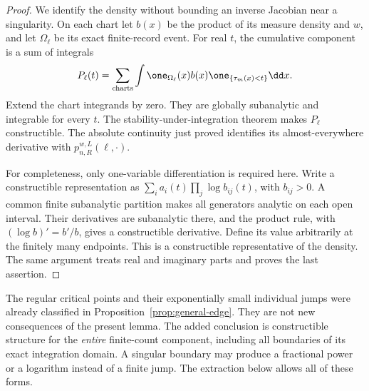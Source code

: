 \begin{proof}
We identify the density without bounding an inverse Jacobian near a
singularity. On each chart let $b(x)$ be the product of its measure
density and $w$, and let $\Omega_\ell$ be its exact finite-record event.
For real $t$, the cumulative component is a sum of integrals
\begin{equation}\label{eq:constructible-cumulative}
 P_\ell(t)=\sum_{\rm charts}\int
   \one_{\Omega_\ell}(x)b(x)\one_{\{\tau_m(x)<t\}}\dd x .
\end{equation}
Extend the chart integrands by zero. They are globally subanalytic and
integrable for every $t$. The stability-under-integration theorem
\cite[Theorem 1.3]{CMInt} makes $P_\ell$ constructible. The absolute
continuity just proved identifies its almost-everywhere derivative with
$p_{n,R}^{w,L}(\ell,\cdot)$.

For completeness, only one-variable differentiation is required here.
Write a constructible representation as
$\sum_i a_i(t)\prod_j\log b_{ij}(t)$, with $b_{ij}>0$.
A common finite subanalytic partition makes all generators analytic on
each open interval. Their derivatives are subanalytic there, and the
product rule, with $(\log b)'=b'/b$, gives a constructible derivative.
Define its value arbitrarily at the finitely many endpoints. This is a
constructible representative of the density. The same argument treats
real and imaginary parts and proves the last assertion.
\end{proof}

\begin{remark}
\label{rem:finite-count-inherited-edge}
The regular critical points and their exponentially small individual
jumps were already classified in Proposition~\ref{prop:general-edge}.
They are not new consequences of the present lemma. The added conclusion
is constructible structure for the \emph{entire} finite-count component,
including all boundaries of its exact integration domain. A singular
boundary may produce a fractional power or a logarithm instead of a
finite jump. The extraction below allows all of these forms.
\end{remark}

